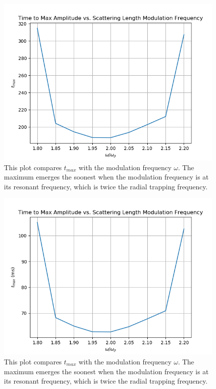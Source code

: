 \documentclass[12]{article}
\begin{document}
\begin{figure}[H]
\centering
\includegraphics[scale=0.9]{tmaxNatUnits}
\caption{This plot compares $t_{max}$ with the modulation frequency $\omega$. The maximum emerges the soonest when the modulation frequency is at its resonant frequency, which is twice the radial trapping frequency.}
\label{fig:tmaxNat}
\end{figure}

\begin{figure}[b]
\centering
\includegraphics[scale=0.9]{tmaxExpUnits}
\caption{This plot compares $t_{max}$ with the modulation frequency $\omega$. The maximum emerges the soonest when the modulation frequency is at its resonant frequency, which is twice the radial trapping frequency.}
\label{fig:tmaxExp}
\end{figure}
\end{document}
